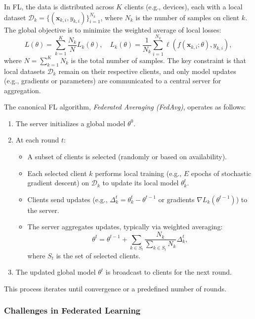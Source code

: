 In FL, the data is distributed across $K$ clients (e.g., devices), each with a local dataset $\mathcal{D}_k = \{(\mathbf{x}_{k,i}, y_{k,i})\}_{i=1}^{N_k}$, where $N_k$ is the number of samples on client $k$. The global objective is to minimize the weighted average of local losses:
\begin{equation}
    L(\theta) = \sum_{k=1}^K \frac{N_k}{N} L_k(\theta), \quad L_k(\theta) = \frac{1}{N_k} \sum_{i=1}^{N_k} \ell(f(\mathbf{x}_{k,i}; \theta), y_{k,i}),
\end{equation}
where $N = \sum_{k=1}^K N_k$ is the total number of samples. The key constraint is that local datasets $\mathcal{D}_k$ remain on their respective clients, and only model updates (e.g., gradients or parameters) are communicated to a central server for aggregation.

The canonical FL algorithm, \emph{Federated Averaging (FedAvg)}, operates as follows:
\begin{enumerate}
    \item The server initializes a global model $\theta^0$.
    \item At each round $t$:
        \begin{itemize}
            \item A subset of clients is selected (randomly or based on availability).
            \item Each selected client $k$ performs local training (e.g., $E$ epochs of stochastic gradient descent) on $\mathcal{D}_k$ to update its local model $\theta_k^t$.
            \item Clients send updates (e.g., $\Delta_k^t = \theta_k^t - \theta^{t-1}$ or gradients $\nabla L_k(\theta^{t-1})$) to the server.
            \item The server aggregates updates, typically via weighted averaging:
            \[
            \theta^t = \theta^{t-1} + \sum_{k \in S_t} \frac{N_k}{\sum_{k \in S_t} N_k} \Delta_k^t,
            \]
            where $S_t$ is the set of selected clients.
        \end{itemize}
    \item The updated global model $\theta^t$ is broadcast to clients for the next round.
\end{enumerate}

This process iterates until convergence or a predefined number of rounds.

\subsubsection{Challenges in Federated Learning}

